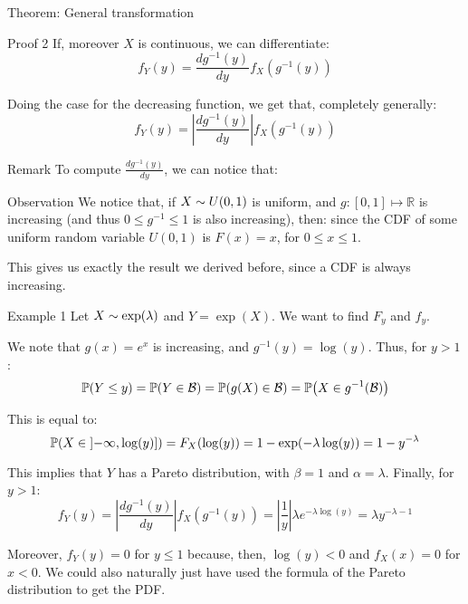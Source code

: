 \documentclass[a4paper]{article}
\begin{document}
\begin{parag}{Theorem: General transformation}
\begin{subparag}{Proof 2}
        If, moreover $X$ is continuous, we can differentiate: 
        \[f_Y\left(y\right) = \frac{dg^{-1}\left(y\right)}{dy} f_X\left(g^{-1}\left(y\right)\right)\]
        
        Doing the case for the decreasing function, we get that, completely generally:
        \[f_Y\left(y\right) = \left|\frac{dg^{-1}\left(y\right)}{dy}\right| f_X\left(g^{-1}\left(y\right)\right)\]
    \end{subparag}

    \begin{subparag}{Remark}
        To compute $\frac{d g^{-1}\left(y\right)}{dy}$, we can notice that: 
    \end{subparag}

    \begin{subparag}{Observation}
        We notice that, if $X \followsdistr U\left(0, 1\right)$ is uniform, and $g: \left[0, 1\right] \mapsto \mathbb{R}$ is increasing (and thus $0 \leq g^{-1} \leq 1$ is also increasing), then: 
        since the CDF of some uniform random variable $U\left(0, 1\right)$ is $F\left(x\right) = x$, for $0 \leq x \leq 1$.

        This gives us exactly the result we derived before, since a CDF is always increasing.
    \end{subparag}
\end{parag}

\begin{parag}{Example 1}
    Let $X \followsdistr \exp\left(\lambda\right)$ and $Y = \exp\left(X\right)$. We want to find $F_y$ and $f_y$.

    We note that $g\left(x\right) = e^x$ is increasing, and $g^{-1}\left(y\right) = \log\left(y\right)$. Thus, for $y > 1$: 
    \[\prob\left(Y \leq y\right) = \prob\left(Y \in \mathcal{B}\right) = \prob\left(g\left(X\right) \in \mathcal{B}\right) = \prob\left(X \in g^{-1}\left(\mathcal{B}\right)\right)\]

    This is equal to:
    \[\prob\left(X \in \left]-\infty, \log\left(y\right)\right] \right) = F_X\left(\log\left(y\right)\right) = 1 - \exp\left(-\lambda \log\left(y\right)\right) = 1 - y^{-\lambda}\]
    
    This implies that $Y$ has a Pareto distribution, with $\beta = 1$ and $\alpha = \lambda$. Finally, for $y > 1$: 
    \[f_Y\left(y\right) = \left|\frac{dg^{-1}\left(y\right)}{dy} \right|f_X\left(g^{-1}\left(y\right)\right) = \left|\frac{1}{y}\right| \lambda e^{-\lambda \log\left(y\right)} = \lambda y^{-\lambda - 1}\]
    
    Moreover, $f_Y\left(y\right) = 0$ for $y \leq 1$ because, then, $\log\left(y\right) < 0$ and $f_X\left(x\right) = 0$ for $x < 0$. We could also naturally just have used the formula of the Pareto distribution to get the PDF.
\end{parag}
\end{document}
